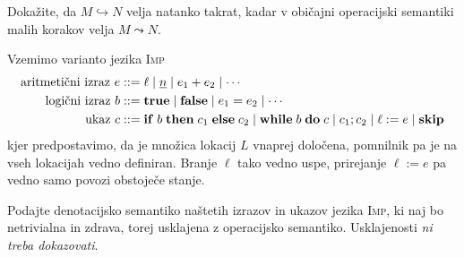 \documentclass[arhiv]{../izpit}
\begin{document}
Dokažite, da $M \hookrightarrow N$ velja natanko takrat, kadar v običajni operacijski semantiki malih korakov velja $M \leadsto N$.

\nadaljevanje


\naloga[\tocke{20}]

Vzemimo varianto jezika \textsc{Imp}
\begin{align*}
  \text{aritmetični izraz } e &::=
    \ell \mid
    \underline{n} \mid
    e_1 + e_2 \mid
    \cdots \\
  \text{logični izraz } b &::=
    \mathbf{true} \mid
    \mathbf{false} \mid
    e_1 = e_2 \mid
    \cdots \\
  \text{ukaz } c &::=
    \mathbf{if}\; b \;\mathbf{then}\; c_1 \;\mathbf{else}\; c_2 \mid
    \mathbf{while}\; b \;\mathbf{do}\; c \mid
    c_1 ; c_2 \mid
    \ell := e \mid
    \mathbf{skip}
\end{align*}
kjer predpostavimo, da je množica lokacij $L$ vnaprej določena, pomnilnik pa je na vseh lokacijah vedno definiran. Branje $\ell$ tako vedno uspe, prirejanje $\ell := e$ pa vedno samo povozi obstoječe stanje.

Podajte denotacijsko semantiko naštetih izrazov in ukazov jezika \textsc{Imp}, ki naj bo netrivialna in zdrava, torej usklajena z operacijsko semantiko. Usklajenosti \emph{ni treba dokazovati}.

\nadaljevanje
\end{document}
